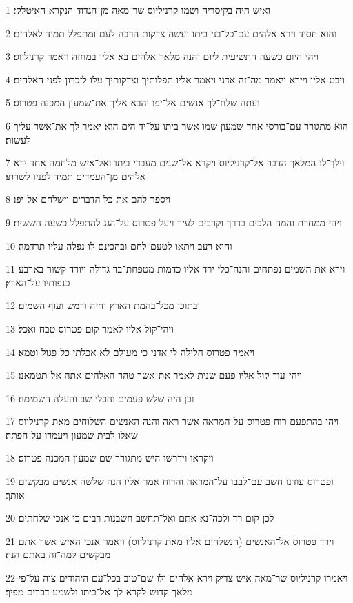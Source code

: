 \par 1 ואיש היה בקיסריה ושמו קרניליוס שר־מאה מן־הגדוד הנקרא האיטלקי׃
\par 2 והוא חסיד וירא אלהים עם־כל־בני ביתו ועשה צדקות הרבה לעם ומתפלל תמיד לאלהים׃
\par 3 ויהי היום כשעה התשיעית ליום והנה מלאך אלהים בא אליו במחזה ויאמר קרניליוס׃
\par 4 ויבט אליו ויירא ויאמר מה־זה אדני ויאמר אליו תפלותיך וצדקותיך עלו לזכרון לפני האלהים׃
\par 5 ועתה שלח־לך אנשים אל־יפו והבא אליך את־שמעון המכנה פטרוס׃
\par 6 הוא מתגורר עם־בורסי אחד שמעון שמו אשר ביתו על־יד הים הוא יאמר לך את־אשר עליך לעשות׃
\par 7 וילך־לו המלאך הדבר אל־קרניליוס ויקרא אל־שנים מעבדי ביתו ואל־איש מלחמה אחד ירא אלהים מן־העמדים תמיד לפניו לשרתו׃
\par 8 ויספר להם את כל הדברים וישלחם אל־יפו׃
\par 9 ויהי ממחרת והמה הלכים בדרך וקרבים לעיר ויעל פטרוס על־הגג להתפלל כשעה הששית׃
\par 10 והוא רעב ויתאו לטעם־לחם ובהכינם לו נפלה עליו תרדמה׃
\par 11 וירא את השמים נפתחים והנה־כלי ירד אליו כדמות מטפחת־בד גדולה ויורד קשור בארבע כנפותיו על־הארץ׃
\par 12 ובתוכו מכל־בהמת הארץ וחיה ורמש ועוף השמים׃
\par 13 ויהי־קול אליו לאמר קום פטרוס טבח ואכל׃
\par 14 ויאמר פטרוס חלילה לי אדני כי מעולם לא אכלתי כל־פגול וטמא׃
\par 15 ויהי־עוד קול אליו פעם שנית לאמר את־אשר טהר האלהים אתה אל־תטמאנו׃
\par 16 וכן היה שלש פעמים והכלי שב והעלה השמימה׃
\par 17 ויהי בהתפעם רוח פטרוס על־המראה אשר ראה והנה האנשים השלוחים מאת קרניליוס שאלו לבית שמעון ויעמדו על־הפתח׃
\par 18 ויקראו וידרשו היש מתגורר שם שמעון המכנה פטרוס׃
\par 19 ופטרוס עודנו חשב עם־לבבו על־המראה והרוח אמר אליו הנה שלשה אנשים מבקשים אותך׃
\par 20 לכן קום רד ולכה־נא אתם ואל־תחשב חשבנות רבים כי אנכי שלחתים׃
\par 21 וירד פטרוס אל־האנשים (הנשלחים אליו מאת קרניליוס) ויאמר אנכי האיש אשר אתם מבקשים למה־זה באתם הנה׃
\par 22 ויאמרו קרניליוס שר־מאה איש צדיק וירא אלהים ולו שם־טוב בכל־עם היהודים צוה על־פי מלאך קדוש לקרא לך אל־ביתו ולשמע דברים מפיך׃
